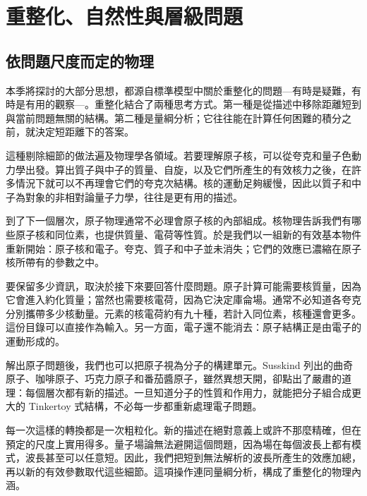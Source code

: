 \chapter{重整化、自然性與層級問題}


\section{依問題尺度而定的物理}

本季將探討的大部分思想，都源自標準模型中關於重整化的問題---有時是疑難，有時是有用的觀察---。重整化結合了兩種思考方式。第一種是從描述中移除距離短到與當前問題無關的結構。第二種是量綱分析；它往往能在計算任何困難的積分之前，就決定短距離下的答案。

這種剔除細節的做法遍及物理學各領域。若要理解原子核，可以從夸克和量子色動力學出發。算出質子與中子的質量、自旋，以及它們所產生的有效核力之後，在許多情況下就可以不再理會它們的夸克次結構。核的運動足夠緩慢，因此以質子和中子為對象的非相對論量子力學，往往是更有用的描述。

到了下一個層次，原子物理通常不必理會原子核的內部組成。核物理告訴我們有哪些原子核和同位素，也提供質量、電荷等性質。於是我們以一組新的有效基本物件重新開始：原子核和電子。夸克、質子和中子並未消失；它們的效應已濃縮在原子核所帶有的參數之中。

要保留多少資訊，取決於接下來要回答什麼問題。原子計算可能需要核質量，因為它會進入約化質量；當然也需要核電荷，因為它決定庫侖場。通常不必知道各夸克分別攜帶多少核動量。元素的核電荷約有九十種，若計入同位素，核種還會更多。這份目錄可以直接作為輸入。另一方面，電子還不能消去：原子結構正是由電子的運動形成的。

解出原子問題後，我們也可以把原子視為分子的構建單元。Susskind 列出的曲奇原子、咖啡原子、巧克力原子和番茄醬原子，雖然異想天開，卻點出了嚴肅的道理：每個層次都有新的描述。一旦知道分子的性質和作用力，就能把分子組合成更大的 Tinkertoy 式結構，不必每一步都重新處理電子問題。

每一次這樣的轉換都是一次粗粒化。新的描述在絕對意義上或許不那麼精確，但在預定的尺度上實用得多。量子場論無法避開這個問題，因為場在每個波長上都有模式，波長甚至可以任意短。因此，我們把短到無法解析的波長所產生的效應加總，再以新的有效參數取代這些細節。這項操作連同量綱分析，構成了重整化的物理內涵。

